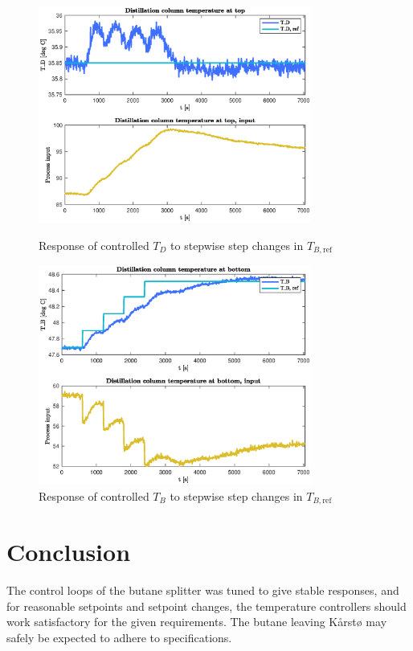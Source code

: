 \documentclass[12pt]{article}
\begin{document}
\begin{figure}[p]
\centering
\includegraphics[width=0.8\textwidth]{../Systemanalyse/Log_Data_to_Matlab/Figurer/LV_tuning/T_D_closed_loop_with_stepwise_T_B_step.eps}
\caption{Response of controlled $T_D$ to stepwise step changes in $T_{B, \textrm{ref}}$}
\label{fig:TD_TB_cl_stepwise}

\includegraphics[width=0.8\textwidth]{../Systemanalyse/Log_Data_to_Matlab/Figurer/LV_tuning/T_B_closed_loop_with_stepwise_T_B_step.eps}
\caption{Response of controlled $T_B$ to stepwise step changes in $T_{B, \textrm{ref}}$}
\label{fig:TB_TB_cl_stepwise}
\end{figure}

\newpage
\section{Conclusion}
The control loops of the butane splitter was tuned to give stable responses, and for reasonable setpoints and setpoint changes, the temperature controllers should work satisfactory for the given requirements. The butane leaving Kårstø may safely be expected to adhere to specifications.
\end{document}
